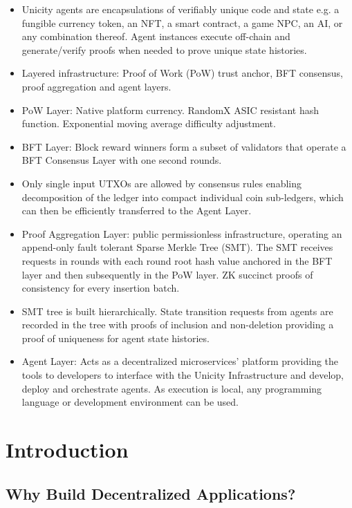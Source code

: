 \documentclass{article}
\begin{document}
\begin{itemize}
    \item Unicity agents are encapsulations of verifiably unique code and state e.g. a fungible currency token, an NFT, a smart contract, a game NPC, an AI, or any combination thereof. Agent instances execute off-chain and generate/verify proofs when needed to prove unique state histories.
    \item Layered infrastructure: Proof of Work (PoW) trust anchor, BFT consensus, proof aggregation and agent layers.
    \item PoW Layer: Native platform currency. RandomX ASIC resistant hash function. Exponential moving average difficulty adjustment.
    \item BFT Layer: Block reward winners form a subset of validators that operate a BFT Consensus Layer with one second rounds.
    \item Only single input UTXOs are allowed by consensus rules enabling decomposition of the ledger into compact individual coin sub-ledgers, which can then be efficiently transferred to the Agent Layer.
    \item Proof Aggregation Layer: public permissionless infrastructure, operating an append-only fault tolerant Sparse Merkle Tree (SMT). The SMT receives requests in rounds with each round root hash value anchored in the BFT layer and then subsequently in the PoW layer. ZK succinct proofs of consistency for every insertion batch.
    \item SMT tree is built hierarchically. State transition requests from agents are recorded in the tree with proofs of inclusion and non-deletion providing a proof of uniqueness for agent state histories.
    \item Agent Layer: Acts as a decentralized microservices' platform providing the tools to developers to interface with the Unicity Infrastructure and develop, deploy and orchestrate agents. As execution is local, any programming language or development environment can be used.
\end{itemize}

\section{Introduction}

\subsection{Why Build Decentralized Applications?}
\end{document}
